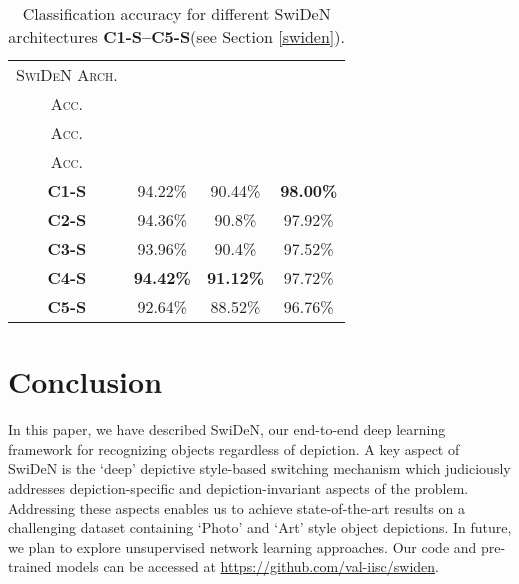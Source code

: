 \documentclass[preprint]{sig-alternate-05-2015}
\begin{document}
\renewcommand{\arraystretch}{1.5}
\begin{table}[ht]
\centering
\footnotesize
\begin{tabular}{|c|c|c|c|}
\hline
\textsc{ SwiDeN Arch.} & \thead{\textsc{Overall} \\ \textsc{Acc.}} & \thead{\textsc{Art} \\ \textsc{Acc.}} & \thead{\textsc{Photo} \\ \textsc{Acc.}} \\
\hline
\hline 
\textbf{C1-S} & 94.22\% & 90.44\% & \textbf{98.00\%} \\
\hline
\textbf{C2-S} & 94.36\% & 90.8\%  & 97.92\% \\
 \hline
\textbf{C3-S} & 93.96\% & 90.4\% & 97.52\% \\
\hline
\textbf{C4-S} & \textbf{94.42\%} & \textbf{91.12\%} & 97.72\% \\
\hline
\textbf{C5-S} & 92.64\% & 88.52\%  & 96.76\% \\ 
\hline
\end{tabular}
\caption{Classification accuracy for different SwiDeN architectures \textbf{C1-S--C5-S}(see Section \ref{swiden}).}
\label{tab:accuracy3}
\end{table}

\section{Conclusion}

In this paper, we have described SwiDeN, our end-to-end deep learning framework for recognizing objects regardless of depiction. A key aspect of SwiDeN is the `deep' depictive style-based switching mechanism which judiciously addresses  depiction-specific and depiction-invariant aspects of the problem. Addressing these aspects enables us to achieve state-of-the-art results on a challenging dataset containing `Photo' and `Art' style object depictions. In future, we plan to explore unsupervised network learning approaches. Our code and pre-trained models can be accessed at \url{https://github.com/val-iisc/swiden}.


\end{document}

